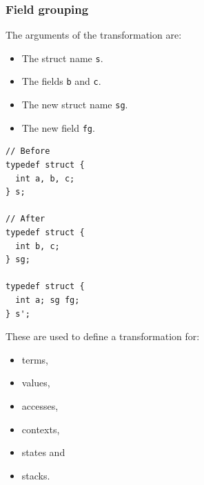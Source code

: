 \begin{frame}[fragile]
\frametitle{Field grouping}

The arguments of the transformation are:
\begin{minipage}{0.55\linewidth}
\begin{itemize}
	\setlength\itemsep{1.5em}
	\item The struct name \texttt{s}.
	\item The fields \texttt{b} and \texttt{c}.
	\item The new struct name \texttt{sg}.
	\item The new field \texttt{fg}.
\end{itemize}
\end{minipage}%
\begin{minipage}{0.35\linewidth}
\begin{lstlisting}[style=Cstyle, basicstyle=\scriptsize]
// Before
typedef struct {
  int a, b, c;
} s;

// After
typedef struct {
  int b, c;
} sg;

typedef struct {
  int a; sg fg;
} s';
\end{lstlisting}
\end{minipage}

\bigskip \pause

These are used to define a transformation for:
\\[0.75em]
\begin{minipage}{0.3\linewidth}

\begin{itemize}
	\item terms,
	\item values,
\end{itemize}
\end{minipage}%
\begin{minipage}{0.3\linewidth}
\begin{itemize}
	\item accesses,
	\item contexts,
\end{itemize}
\end{minipage}%
\begin{minipage}{0.3\linewidth}
\begin{itemize}
	\item states and
	\item stacks.
\end{itemize}
\end{minipage}

\end{frame}


